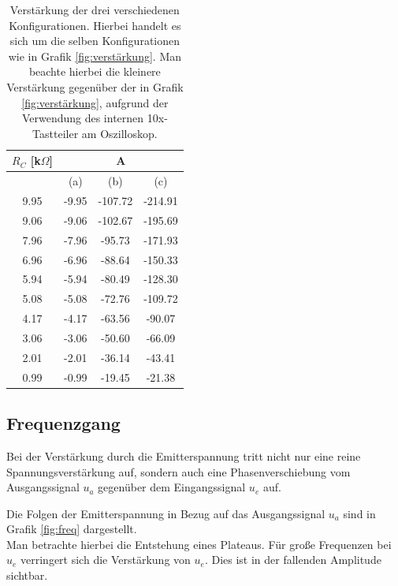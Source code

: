 \documentclass[a4paper,usenatbib]{aspdoc}
\begin{document}
            
            \begin{table}
                \centering
                \begin{tabular}{c|ccc}
                    \multicolumn{1}{c}{$R_C$ [k$\Omega$]} & \multicolumn{3}{c}{A} \\
                    \cmidrule(l){0-0}\cmidrule(lr){2-4}
                    \toprule
                         & (a)   & (b)     & (c)    \\ 
                    9.95 & -9.95 & -107.72 & -214.91  \\ 
                    9.06 & -9.06 & -102.67 & -195.69   \\ 
                    7.96 & -7.96 & -95.73 & -171.93   \\ 
                    6.96 & -6.96 & -88.64 & -150.33  \\
                    5.94 & -5.94 & -80.49 & -128.30 \\
                    5.08 & -5.08 & -72.76 & -109.72 \\
                    4.17 & -4.17   & -63.56   & -90.07 \\
                    3.06 & -3.06  & -50.60  & -66.09  \\
                    2.01 & -2.01 & -36.14 & -43.41  \\
                    0.99 & -0.99 & -19.45 & -21.38 \\
                    \bottomrule
                \end{tabular}
                \caption{Verstärkung der drei verschiedenen Konfigurationen. Hierbei handelt es sich um die selben Konfigurationen wie in Grafik \ref{fig:verstärkung}. Man beachte hierbei die kleinere Verstärkung gegenüber der in Grafik \ref{fig:verstärkung}, aufgrund der Verwendung des internen 10x-Tastteiler am Oszilloskop.}
                \label{tab:verstärkung}
            \end{table}
              
                
            
        \subsection{Frequenzgang}
            Bei der Verstärkung durch die Emitterspannung tritt nicht nur eine reine Spannungsverstärkung auf, sondern auch eine Phasenverschiebung vom Ausgangssignal $u_a$ gegenüber dem Eingangssignal $u_e$ auf. 
            
            \noindent Die Folgen der Emitterspannung in Bezug auf das Ausgangssignal $u_a$ sind in Grafik \ref{fig:freq} dargestellt.\\ 
            Man betrachte hierbei die Entstehung eines Plateaus. Für große Frequenzen bei $u_e$ verringert sich die Verstärkung von $u_e$. Dies ist in der fallenden Amplitude sichtbar. 
            
\end{document}
